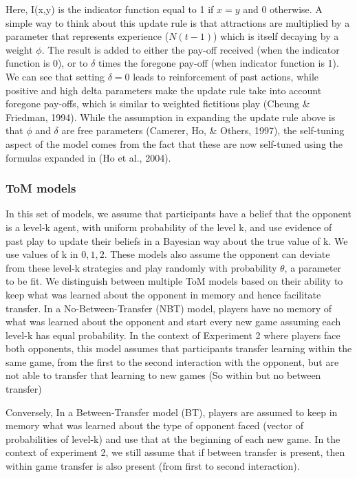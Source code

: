 \documentclass[man,floatsintext]{apa6}
\begin{document}
Here, I(x,y) is the indicator function equal to 1 if \(x = y\) and 0 otherwise. A simple way to think about this update rule is that attractions are multiplied by a parameter that represents experience (\(N(t-1)\)) which is itself decaying by a weight \(\phi\). The result is added to either the pay-off received (when the indicator function is 0), or to \(\delta\) times the foregone pay-off (when indicator function is 1). We can see that setting \(\delta = 0\) leads to reinforcement of past actions, while positive and high delta parameters make the update rule take into account foregone pay-offs, which is similar to weighted fictitious play (Cheung \& Friedman, 1994).
While the assumption in expanding the update rule above is that \(\phi\) and \(\delta\) are free parameters (Camerer, Ho, \& Others, 1997), the self-tuning aspect of the model comes from the fact that these are now self-tuned using the formulas expanded in (Ho et al., 2004).

\hypertarget{tom-models}{%
\subsubsection{ToM models}\label{tom-models}}

In this set of models, we assume that participants have a belief that the opponent is a level-k agent, with uniform probability of the level k, and use evidence of past play to update their beliefs in a Bayesian way about the true value of k. We use values of k in \({0,1,2}\). These models also assume the opponent can deviate from these level-k strategies and play randomly with probability \(\theta\), a parameter to be fit. We distinguish between multiple ToM models based on their ability to keep what was learned about the opponent in memory and hence facilitate transfer. In a No-Between-Transfer (NBT) model, players have no memory of what was learned about the opponent and start every new game assuming each level-k has equal probability. In the context of Experiment 2 where players face both opponents, this model assumes that participants transfer learning within the same game, from the first to the second interaction with the opponent, but are not able to transfer that learning to new games (So within but no between transfer)

Conversely, In a Between-Transfer model (BT), players are assumed to keep in memory what was learned about the type of opponent faced (vector of probabilities of level-k) and use that at the beginning of each new game. In the context of experiment 2, we still assume that if between transfer is present, then within game transfer is also present (from first to second interaction).
\end{document}
